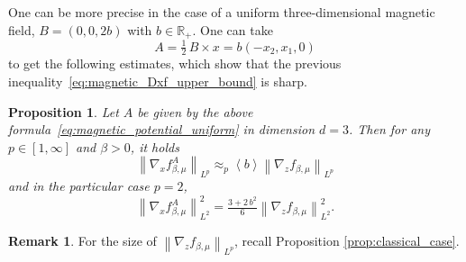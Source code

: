 \documentclass[11pt]{amsart}
\theoremstyle{plain}
\newtheorem{prop}[theorem]{Proposition}
\theoremstyle{definition}
\newtheorem{remark}[theorem]{Remark}
\newcommand		{\RR}		{\mathbb R}			%
\newcommand		{\R}		{\RR}
\newcommand		{\lt}			{\left}				%
\newcommand		{\rt}			{\right}			%
\renewcommand	{\(}			{\lt(}
\renewcommand	{\)}			{\rt)}
\newcommand		{\bangle}[1]	{\lt\langle #1\rt\rangle}
\newcommand		{\weight}[1]	{\bangle{#1}}	%
\newcommand		{\nrm}[1]		{\lt\lVert #1\rt\rVert}
\newcommand		{\Nrm}[2]		{\nrm{#1}_{#2}}
\newcommand			{\Dx}		{\nabla_x}
\begin{document}
	One can be more precise in the case of a uniform three-dimensional magnetic field, $B = (0, 0, 2b)$ with $b \in \R_+$. One can take  
	\begin{equation}\label{eq:magnetic_potential_uniform}
		A = \tfrac{1}{2}\, B \times x =  b \lt(-x_2, x_1, 0\rt)
	\end{equation}
	to get the following estimates, which show that the previous inequality~\eqref{eq:magnetic_Dxf_upper_bound} is sharp.
	\begin{prop}\label{prop:classical-mganetic}
		Let $A$ be given by the above formula~\eqref{eq:magnetic_potential_uniform} in dimension $d=3$. Then for any $p\in[1,\infty]$ and $\beta> 0$, it holds
		\begin{equation*}
			\Nrm{\Dx f_{\beta,\mu}^A}{L^p} \approx_p \weight{b} \Nrm{\nabla_z f_{\beta,\mu}}{L^p}
		\end{equation*}
		and in the particular case $p=2$,
		\begin{equation*}
			\Nrm{\Dx f_{\beta,\mu}^A}{L^2}^2 = \tfrac{3+2\,b^2}{6}  \Nrm{\nabla_z f_{\beta,\mu}}{L^2}^2 .
		\end{equation*}
	\end{prop}

    \begin{remark}
        For the size of $\Nrm{\nabla_z f_{\beta,\mu}}{L^p}$, recall Proposition \ref{prop:classical_case}.
    \end{remark}
	
\end{document}
